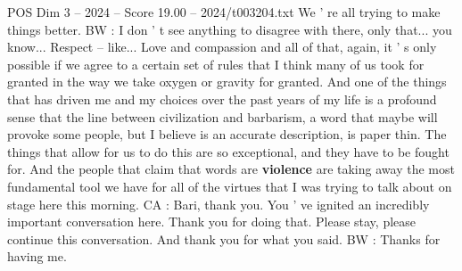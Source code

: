\begin{textsample}{POS Dim 3 – 2024 – Score 19.00 – 2024/t003204.txt}
We ' re all trying to make things better.
BW : I don ' t see anything to disagree with there, only that... you know...
Respect -- like...
Love and compassion and all of that, again, it ' s only possible if we agree to a certain set of rules that I think many of us took for granted in the way we take oxygen or gravity for granted.
And one of the things that has driven me and my choices over the past years of my life is a profound sense that the line between civilization and barbarism, a word that maybe will provoke some people, but I believe is an accurate description, is paper thin.
The things that allow for us to do this are so exceptional, and they have to be fought for.
And the people that claim that words are \textbf{violence} are taking away the most fundamental tool we have for all of the virtues that I was trying to talk about on stage here this morning.
CA : Bari, thank you.
You ' ve ignited an incredibly important conversation here.
Thank you for doing that.
Please stay, please continue this conversation.
And thank you for what you said.
BW : Thanks for having me.

\end{textsample}
